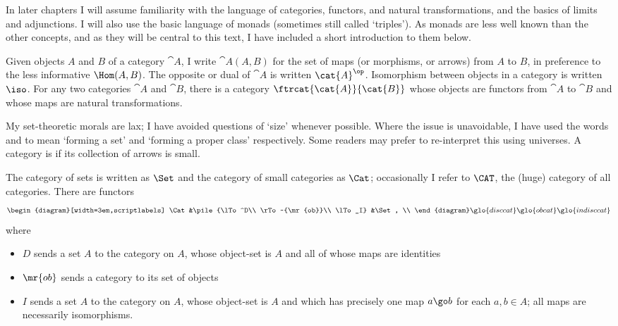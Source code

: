 In later chapters I will assume familiarity with the language of
categories, functors, and natural transformations, and the basics of limits
and adjunctions.  I will also use the basic language of monads (sometimes
still called `triples').  As monads are less well known than the other
concepts, and as they will be central to this text, I have included a short
introduction to them below.  

Given objects $A$ and $B$ of a category $\cat{A}$, I write $\cat{A}(A,B)$%
% 
%
for the set of maps (or morphisms, or arrows) from $A$ to $B$, in
preference to the less informative $\Hom(A,B)$.  The opposite%
%
%
%
%
or dual%
%
%
of
$\cat{A}$ is written $\cat{A}^\op$.%
% 
%
 Isomorphism%
%
%
between objects in a
category is written $\iso$.%
% 
%
 For any two categories $\cat{A}$ and
$\cat{B}$, there is a category $\ftrcat{\cat{A}}{\cat{B}}$%
% 
%
whose objects
are functors from $\cat{A}$ to $\cat{B}$ and whose maps are natural
transformations.

My set-theoretic%
%
%
morals are lax; I have avoided questions of `size'
whenever possible.  Where the issue is unavoidable, I have used the words
%
%
%
and %
%
%
to mean `forming a set' and `forming a
proper class' respectively.  Some readers may prefer to re-interpret this
using universes.  A category is  if its collection of arrows
is small.

The category of sets is written as $\Set$%
% 
%
and the category of small
categories as $\Cat$;%
% 
%
occasionally I refer to $\CAT$, the (huge)
category of all categories.  There are functors
\[
\begin{diagram}[width=3em,scriptlabels]
\Cat	&\pile{\lTo^D\\ \rTo~{\mr{ob}}\\ \lTo_I}	&\Set,	\\
\end{diagram}
\glo{disccat}\glo{obcat}\glo{indisccat}
\]
where
%
\begin{itemize}
\item $D$ sends a set $A$ to the %
%
%
category on $A$,
whose object-set is $A$ and all of whose maps are identities
\item $\mr{ob}$ sends a category to its set of objects%
%
%
\item $I$ sends a set $A$ to the %
%
%
category on $A$, whose object-set is $A$ and which has precisely one map $a
\go b$ for each $a, b \in A$; all maps are necessarily isomorphisms.
\end{itemize}

